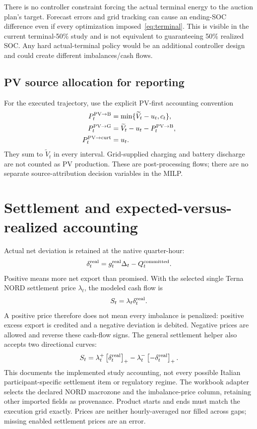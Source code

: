 \documentclass[11pt,a4paper]{article}
\newcommand{\pos}[1]{\left[#1\right]_+}
\begin{document}
There is no controller constraint forcing the actual terminal energy to the
auction plan's target. Forecast errors and grid tracking can cause an ending-SOC
difference even if every optimization imposed~\eqref{eq:terminal}. This is visible
in the current terminal-50\% study and is not equivalent to guaranteeing 50\%
realized SOC. Any hard actual-terminal policy would be an additional controller
design and could create different imbalances/cash flows.

\subsection{PV source allocation for reporting}
For the executed trajectory, use the explicit PV-first accounting convention
\begin{align}
 P^{\rm PV\to B}_t&=\min\{\widetilde V_t-u_t,c_t\},\\
 P^{\rm PV\to G}_t&=\widetilde V_t-u_t-P^{\rm PV\to B}_t,\\
 P^{\rm PV\to curt}_t&=u_t.
\end{align}
They sum to $\widetilde V_t$ in every interval. Grid-supplied charging and battery
discharge are not counted as PV production. These are post-processing flows;
there are no separate source-attribution decision variables in the MILP.

\section{Settlement and expected-versus-realized accounting}

Actual net deviation is retained at the native quarter-hour:
\begin{equation}
 \delta_t^{\rm real}=g_t^{\rm real}\Delta_t-Q_t^{\rm committed}.
\end{equation}
Positive means more net export than promised. With the selected single Terna
NORD settlement price $\lambda_t$, the modeled cash flow is
\begin{equation}
 S_t=\lambda_t\delta_t^{\rm real}.
\end{equation}
A positive price therefore does not mean every imbalance is penalized: positive
excess export is credited and a negative deviation is debited. Negative prices
are allowed and reverse these cash-flow signs. The general settlement helper
also accepts two directional curves:
\begin{equation}
 S_t=\lambda_t^+\pos{\delta_t^{\rm real}}
       -\lambda_t^-\pos{-\delta_t^{\rm real}}.
\end{equation}
This documents the implemented study accounting, not every possible Italian
participant-specific settlement item or regulatory regime. The workbook adapter
selects the declared NORD macrozone and the imbalance-price column, retaining
other imported fields as provenance. Product starts and ends must match the
execution grid exactly. Prices are neither hourly-averaged nor filled across
gaps; missing enabled settlement prices are an error.
\end{document}
